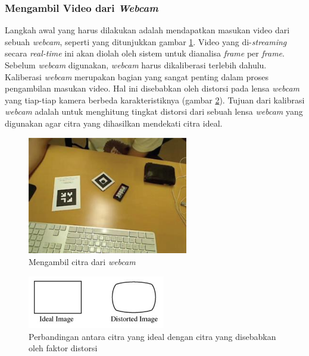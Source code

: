 \subsubsection {Mengambil Video dari \textit{Webcam}}
\label{subsubsec:capture_webcam}
Langkah awal yang harus dilakukan adalah mendapatkan masukan video dari sebuah \textit{webcam}, seperti yang ditunjukkan gambar \ref{fig:capture_from_webcam}. Video yang di-\textit{streaming} secara \textit{real-time} ini akan diolah oleh sistem untuk dianalisa \textit{frame} per \textit{frame}. Sebelum \textit{webcam} digunakan, \textit{webcam} harus dikaliberasi terlebih dahulu. Kaliberasi \textit{webcam} merupakan bagian yang sangat penting dalam proses pengambilan masukan video. Hal ini disebabkan oleh distorsi pada lensa \textit{webcam} yang tiap-tiap kamera berbeda karakteristiknya (gambar \ref{fig:distorted_image}). Tujuan dari kalibrasi \textit{webcam} adalah untuk menghitung tingkat distorsi dari sebuah lensa \textit{webcam} yang digunakan agar citra yang dihasilkan mendekati citra ideal.

\begin{figure}[h]
\begin{center}
\includegraphics[width=7cm]{./images/flartk/capture_webcam.JPG}
\caption{\label{fig:capture_from_webcam} Mengambil citra dari \textit{webcam}}
\end{center}
\end{figure}


\begin{figure}[h]
\begin{center}
\includegraphics[width=6cm]{./images/flartk/distorted_image.JPG}
\caption{\label{fig:distorted_image} Perbandingan antara citra yang ideal dengan citra yang disebabkan oleh faktor distorsi}
\end{center}
\end{figure}

